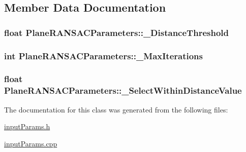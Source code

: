 \subsection{Member Data Documentation}
\hypertarget{classPlaneRANSACParameters_a2f3a7aba4f478cb3eb9a97866b96f9fd}{
\subsubsection[{\-\_\-\-Distance\-Threshold}]{\setlength{\rightskip}{0pt plus 5cm}float Plane\-R\-A\-N\-S\-A\-C\-Parameters\-::\-\_\-\-Distance\-Threshold\hspace{0.3cm}{\ttfamily [private]}}}\label{classPlaneRANSACParameters_a2f3a7aba4f478cb3eb9a97866b96f9fd}
\hypertarget{classPlaneRANSACParameters_a39d98b888f629b455b35365991d303ab}{
\subsubsection[{\-\_\-\-Max\-Iterations}]{\setlength{\rightskip}{0pt plus 5cm}int Plane\-R\-A\-N\-S\-A\-C\-Parameters\-::\-\_\-\-Max\-Iterations\hspace{0.3cm}{\ttfamily [private]}}}\label{classPlaneRANSACParameters_a39d98b888f629b455b35365991d303ab}
\hypertarget{classPlaneRANSACParameters_a8e68f5852309a371af04f221a6e3ac7c}{
\subsubsection[{\-\_\-\-Select\-Within\-Distance\-Value}]{\setlength{\rightskip}{0pt plus 5cm}float Plane\-R\-A\-N\-S\-A\-C\-Parameters\-::\-\_\-\-Select\-Within\-Distance\-Value\hspace{0.3cm}{\ttfamily [private]}}}\label{classPlaneRANSACParameters_a8e68f5852309a371af04f221a6e3ac7c}


The documentation for this class was generated from the following files\-:\begin{DoxyCompactItemize}
\item 
\hyperlink{inputParams_8h}{input\-Params.\-h}\item 
\hyperlink{inputParams_8cpp}{input\-Params.\-cpp}\end{DoxyCompactItemize}

